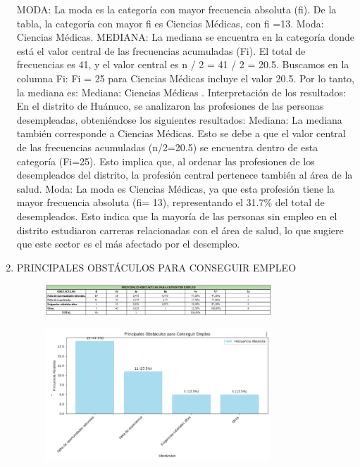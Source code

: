 \documentclass[12pt, a4paper]{article}
\begin{document}
\begin{enumerate}
\begin{figure}[H]
\begin{center}
        \end{center}
        \label{fig:fram2}
    \end{figure}
    MODA: La moda es la categoría con mayor frecuencia absoluta (fi). De la tabla, la categoría con mayor fi es Ciencias Médicas, con fi =13. Moda: Ciencias Médicas.
MEDIANA: La mediana se encuentra en la categoría donde está el valor central de las frecuencias acumuladas (Fi). El total de frecuencias es 41, y el valor central es n / 2 = 41 / 2 = 20.5. Buscamos en la columna Fi: Fi = 25 para Ciencias Médicas incluye el valor 20.5. Por lo tanto, la mediana es: Mediana: Ciencias Médicas	.
Interpretación de los resultados: En el distrito de Huánuco, se analizaron las profesiones de las personas desempleadas, obteniéndose los siguientes resultados:
Mediana:
La mediana también corresponde a Ciencias Médicas. Esto se debe a que el valor central de las frecuencias acumuladas (n/2=20.5) se encuentra dentro de esta categoría (Fi=25).  Esto implica que, al ordenar las profesiones de los desempleados del distrito, la profesión central pertenece también al área de la salud.	
Moda:
La moda es Ciencias Médicas, ya que esta profesión tiene la mayor frecuencia absoluta (fi= 13), representando el 31.7\% del total de desempleados.
Esto indica que la mayoría de las personas sin empleo en el distrito estudiaron carreras relacionadas con el área de salud, lo que sugiere que este sector es el más afectado por el desempleo.
\item PRINCIPALES OBSTÁCULOS PARA CONSEGUIR EMPLEO
\begin{figure}[H]
    \begin{center}
        \includegraphics[width=0.80\textwidth]{images/obst.png}
    \end{center}
    \label{fig:obst}
\end{figure}
\begin{figure}[H]
    \begin{center}
        \includegraphics[width=0.80\textwidth]{images/obs21.png}

\end{center}
\end{figure}
\end{enumerate}
\end{document}
